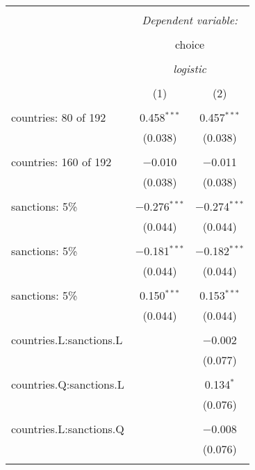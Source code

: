 
\begin{table}[!htbp] \centering 
  \caption{} 
  \label{tab:int} 
\begin{tabular}{@{\extracolsep{5pt}}lcc} 
\\[-1.8ex]\hline 
\hline \\[-1.8ex] 
 & \multicolumn{2}{c}{\textit{Dependent variable:}} \\ 
\cline{2-3} 
\\[-1.8ex] & \multicolumn{2}{c}{choice} \\ 
\\[-1.8ex] & \multicolumn{2}{c}{\textit{logistic}} \\ 
\\[-1.8ex] & (1) & (2)\\ 
\hline \\[-1.8ex] 
 countries:  80 of 192 & 0.458$^{***}$ & 0.457$^{***}$ \\ 
  & (0.038) & (0.038) \\ 
  & & \\ 
 countries:  160 of 192 & $-$0.010 & $-$0.011 \\ 
  & (0.038) & (0.038) \\ 
  & & \\ 
 sanctions: 5\% & $-$0.276$^{***}$ & $-$0.274$^{***}$ \\ 
  & (0.044) & (0.044) \\ 
  & & \\ 
 sanctions: 5\% & $-$0.181$^{***}$ & $-$0.182$^{***}$ \\ 
  & (0.044) & (0.044) \\ 
  & & \\ 
 sanctions: 5\% & 0.150$^{***}$ & 0.153$^{***}$ \\ 
  & (0.044) & (0.044) \\ 
  & & \\ 
 countries.L:sanctions.L &  & $-$0.002 \\ 
  &  & (0.077) \\ 
  & & \\ 
 countries.Q:sanctions.L &  & 0.134$^{*}$ \\ 
  &  & (0.076) \\ 
  & & \\ 
 countries.L:sanctions.Q &  & $-$0.008 \\ 
  &  & (0.076) \\ 
  & & \\ 

\end{tabular}
\end{table}

